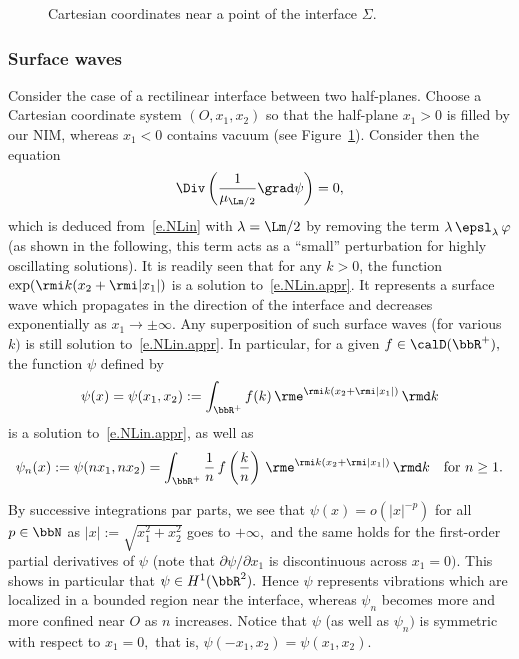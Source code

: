 \begin{figure}[!t]
\begin{center}
\end{center}
\caption{Cartesian coordinates near a point of the interface $\Sigma.$}\label{f.surf-res}
\end{figure}

\subsubsection{Surface waves}
Consider the case of a rectilinear interface between two half-planes. Choose a Cartesian coordinate system $(O,x_1,x_2)$ so that the half-plane $x_1 > 0$ is filled by our NIM, whereas $x_1 < 0$ contains vacuum (see Figure~\ref{f.surf-res}). Consider then the equation
\begin{equation}\label{e.NLin.appr}
\Div \left(\frac{1}{\mu_{\Lm/2}} \grad \psi \right) = 0,
\end{equation}
which is deduced from~\eqref{e.NLin} with $\lambda = \Lm/2$ by removing the term $\lambda\,\epsl_\lambda\,\varphi$ (as shown in the following, this term acts as a ``small'' perturbation for highly oscillating solutions). It is readily seen that for any $k>0$, the function $\exp(\rmi k(x_2 + \rmi |x_1|)$ is a solution to~\eqref{e.NLin.appr}. It represents a surface wave which propagates in the direction of the interface and decreases exponentially as $x_1 \to \pm\infty.$ Any superposition of such surface waves (for various $k)$ is still solution to~\eqref{e.NLin.appr}. In particular, for a given $f \in \calD(\bbR^+),$ the function $\psi$ defined by
\[
\psi(x) = \psi(x_1,x_2) :=
\int_{\bbR^+} f(k)\,\rme^{\rmi k(x_2 + \rmi |x_1|)}\, \rmd k
\]
is a solution to~\eqref{e.NLin.appr}, as well as
\[
\psi_n(x) := \psi(nx_1,nx_2) =
\int_{\bbR^+} \frac{1}{n}\,f\left(\frac{k}{n}\right)\,\rme^{\rmi k(x_2 + \rmi |x_1|)}\, \rmd k
\quad\text{for }n \geq 1.
\]

\begin{rema}\label{r.surf-res}
By successive integrations par parts, we see that $\psi(x) = o(|x|^{-p})$ for all $p \in \bbN$ as $|x| := \sqrt{x_1^2 + x_2^2}$ goes to $+\infty,$ and the same holds for the first-order partial derivatives of $\psi$ (note that $\partial\psi/\partial x_1$ is discontinuous across $x_1=0).$ This shows in particular that $\psi \in H^1(\bbR^2).$ Hence $\psi$ represents vibrations which are localized in a bounded region near the interface, whereas $\psi_n$ becomes more and more confined near $O$ as $n$ increases. Notice that $\psi$ (as well as $\psi_n)$ is symmetric with respect to $x_1=0,$ that is, $\psi(-x_1,x_2) = \psi(x_1,x_2).$
\end{rema}

